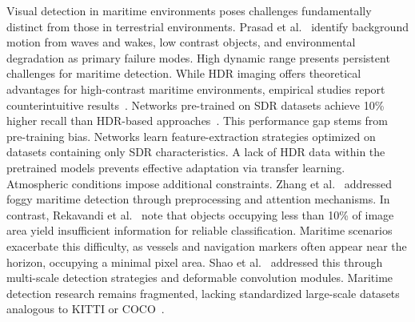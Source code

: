 \documentclass{erauthesis}
\begin{document}
Visual detection in maritime environments poses challenges fundamentally distinct from those in terrestrial environments.
Prasad et al.~\cite{prasad2017} identify background motion from waves and wakes, low contrast objects, and environmental degradation as primary failure modes.
High dynamic range presents persistent challenges for maritime detection.
While HDR imaging offers theoretical advantages for high-contrast maritime environments, empirical studies report counterintuitive results~\cite{landaeta, liebergall, wang2019a, kocdemir2022}.
Networks pre-trained on \ac{SDR} datasets achieve 10\% higher recall than HDR-based approaches~\cite{landaeta, liebergall}.
This performance gap stems from pre-training bias.
Networks learn feature-extraction strategies optimized on datasets containing only SDR characteristics. A lack of HDR data within the pretrained models prevents effective adaptation via transfer learning.
Atmospheric conditions impose additional constraints.
Zhang et al.~\cite{zhang2022a} addressed foggy maritime detection through preprocessing and attention mechanisms. In contrast, Rekavandi et al.~\cite{rekavandi2022} note that objects occupying less than 10\% of image area yield insufficient information for reliable classification.
Maritime scenarios exacerbate this difficulty, as vessels and navigation markers often appear near the horizon, occupying a minimal pixel area.
Shao et al.~\cite{shao2022} addressed this through multi-scale detection strategies and deformable convolution modules.
Maritime detection research remains fragmented, lacking standardized large-scale datasets analogous to KITTI or COCO~\cite{zhang2021, yang2024, su2023}.



\end{document}
